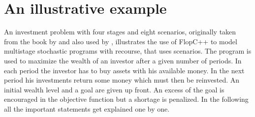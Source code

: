 \documentclass[a4paper,10pt,pdftex]{scrartcl}
\begin{document}
\section{An illustrative example}
An investment problem with four stages and eight scenarios, originally taken from the book by \cite{Birge1997a} and also used by \cite{Kaut2008}, illustrates the use of FlopC++ to model multistage stochastic programs with recourse, that uses scenarios. The program is used to maximize the wealth of an investor after a given number of periods. In each period the investor has to buy assets with his available money. In the next period his investments return some money which must then be reinvested. An initial wealth level and a goal are given up front. An excess of the goal is encouraged in the objective function but a shortage is penalized. In the following all the important statements get explained one by one. 
\end{document}
